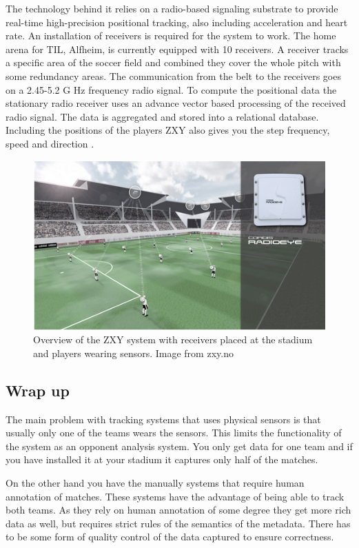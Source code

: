 The technology behind it relies on a radio-based signaling substrate to provide real-time high-precision positional tracking, also including acceleration and heart rate. An installation of receivers is required for the system to work. The home arena for \ac{TIL}, Alfheim, is currently equipped with 10 receivers. A receiver tracks a specific area of the soccer field and combined they cover the whole pitch with some redundancy areas. The communication from the belt to the receivers goes on a 2.45-5.2 G Hz frequency radio signal. To compute the positional data the stationary radio receiver uses an advance vector based processing of the received radio signal. The data is aggregated and stored into a relational database. Including the positions of the players ZXY also gives you the step frequency, speed and direction \cite{PTW}.

\begin{figure}[ht!]
\centering
\includegraphics[width=1\textwidth]{images/general/zxyoverview.png}
\caption{Overview of the ZXY system with receivers placed at the stadium and players wearing sensors. Image from zxy.no}
\label{fig:zxycam}
\end{figure}

\subsection{Wrap up}
The main problem with tracking systems that uses physical sensors is that usually only one of the teams wears the sensors. This limits the functionality of the system as an opponent analysis system. You only get data for one team and if you have installed it at your stadium it captures only half of the matches. 

On the other hand you have the manually systems that require human annotation of matches. These systems have the advantage of being able to track both teams. As they rely on human annotation of some degree they get more rich data as well, but requires strict rules of the semantics of the metadata. There has to be some form of quality control of the data captured to ensure correctness. 

